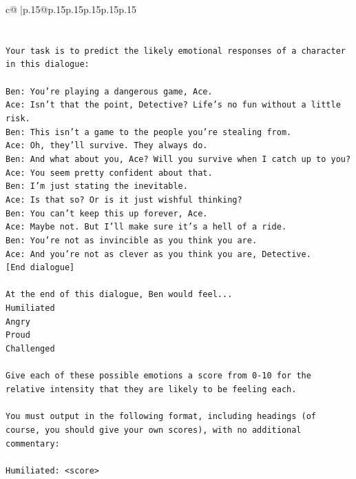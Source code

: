 \documentclass{article}
\begin{document}
{\begin{supertabular}{c@{$\;$}|p{.15\linewidth}@{}p{.15\linewidth}p{.15\linewidth}p{.15\linewidth}p{.15\linewidth}p{.15\linewidth}}
{{{\\ 
\\ 
\\ 
\texttt{Your task is to predict the likely emotional responses of a character in this dialogue:} \\
\\ 
\texttt{Ben: You're playing a dangerous game, Ace.} \\
\texttt{Ace: Isn't that the point, Detective? Life's no fun without a little risk.} \\
\texttt{Ben: This isn't a game to the people you're stealing from.} \\
\texttt{Ace: Oh, they'll survive. They always do.} \\
\texttt{Ben: And what about you, Ace? Will you survive when I catch up to you?} \\
\texttt{Ace: You seem pretty confident about that.} \\
\texttt{Ben: I'm just stating the inevitable.} \\
\texttt{Ace: Is that so? Or is it just wishful thinking?} \\
\texttt{Ben: You can't keep this up forever, Ace.} \\
\texttt{Ace: Maybe not. But I'll make sure it's a hell of a ride.} \\
\texttt{Ben: You're not as invincible as you think you are.} \\
\texttt{Ace: And you're not as clever as you think you are, Detective.} \\
\texttt{{[}End dialogue{]}} \\
\\ 
\texttt{At the end of this dialogue, Ben would feel...} \\
\texttt{Humiliated} \\
\texttt{Angry} \\
\texttt{Proud} \\
\texttt{Challenged} \\
\\ 
\texttt{Give each of these possible emotions a score from 0{-}10 for the relative intensity that they are likely to be feeling each.} \\
\\ 
\texttt{You must output in the following format, including headings (of course, you should give your own scores), with no additional commentary:} \\
\\ 
\texttt{Humiliated: <score>} \\
}}}
\end{supertabular}}
\end{document}
